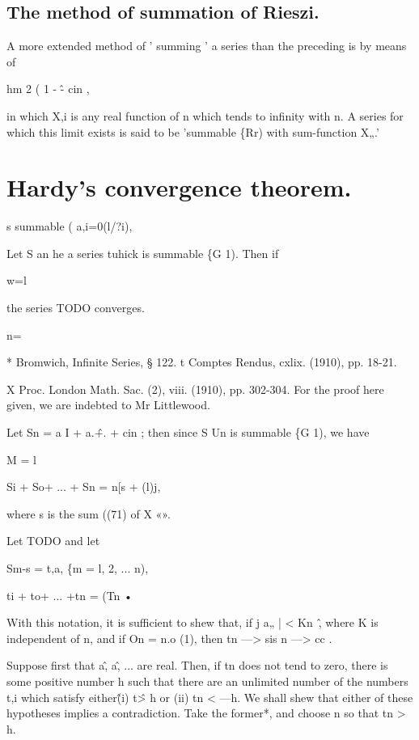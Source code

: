 \subsection{The method of summation of Rieszi.}

A more extended method of ' summing ' a series than the preceding is
by means of

hm 2 ( 1 - \^- cin ,

in which X,i is any real function of n which tends to infinity with n.
A series for which this limit exists is said to be 'summable \{Rr)
with sum-function X„.'


\section{Hardy's convergence theorem.}

s summable (
a,i=0(l/?i),



Let S an he a series tuhick is summable \{G 1). Then if

w=l

the series TODO converges.

n=\

* Bromwich, Infinite Series, § 122.
t Comptes Rendus, cxlix. (1910), pp. 18-21.

X Proc. London Math. Sac. (2), viii. (1910), pp. 302-304. For the
proof here given, we are indebted to Mr Littlewood.


Let Sn = a I + a.\^ +. + cin ; then since S Un is summable \{G 1), we
have

% 
% 

M = l

Si + So+ ... + Sn = n[s + (l)j,

where s is the sum ((71) of X «».

Let TODO and let

Sm-s = t,a, \{m = l, 2, ... n),

ti + to+ ... +tn = (Tn •

With this notation, it is sufficient to shew that, if j a„ | < Kn~\^,
where K is independent of n, and if On = n.o (1), then tn —> sis n —>
cc .

Suppose first that a\^, a\^, ... are real. Then, if tn does not tend
to zero, there is some positive number h such that there are an
unlimited number of the numbers t,i which satisfy either\^ (i) t\^ > h
or (ii) tn < —h. We shall shew that either of these hypotheses implies
a contradiction. Take the former*, and choose n so that tn > h.


